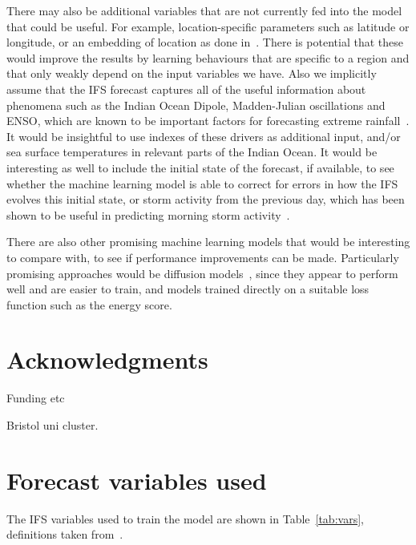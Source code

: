 \documentclass{article}
\begin{document}
There may also be additional variables that are not currently fed into the model that could be useful. For example, location-specific parameters such as latitude or longitude, or an embedding of location as done in~\cite{rasp_neural_2018}. There is potential that these would improve the results by learning behaviours that are specific to a region and that only weakly depend on the input variables we have. Also we implicitly assume that the IFS forecast captures all of the useful information about phenomena such as the Indian Ocean Dipole, Madden-Julian oscillations and ENSO, which are known to be important factors for forecasting extreme rainfall~\citep{wainwright_extreme_2021, palmer_drivers_2023}. It would be insightful to use indexes of these drivers as additional input, and/or sea surface temperatures in relevant parts of the Indian Ocean. It would be interesting as well to include the initial state of the forecast, if available, to see whether the machine learning model is able to correct for errors in how the IFS evolves this initial state, or storm activity from the previous day, which has been shown to be useful in predicting morning storm activity~\citep{thiery_early_2017}. 

There are also other promising machine learning models that would be interesting to compare with, to see if performance improvements can be made. Particularly promising approaches would be diffusion models~\citep{addison_machine_2022, leinonen_latent_2023}, since they appear to perform well and are easier to train, and models trained directly on a suitable loss function such as the energy score.

\section*{Acknowledgments}

Funding etc

Bristol uni cluster.



\appendix

\section{Forecast variables used}\label{app:fcst_vars}
The IFS variables used to train the model are shown in Table~\ref{tab:vars}, definitions taken from~\citep{ecmwf_parameter_2023}.
\end{document}
